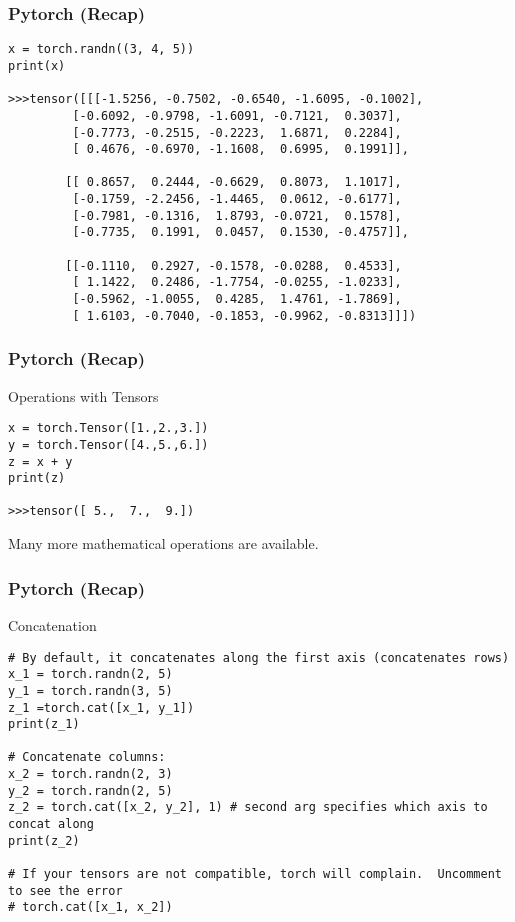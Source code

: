 \begin{frame}[fragile]
\frametitle{Pytorch (Recap)}
 \begin{lstlisting}
x = torch.randn((3, 4, 5))
print(x)

>>>tensor([[[-1.5256, -0.7502, -0.6540, -1.6095, -0.1002],
         [-0.6092, -0.9798, -1.6091, -0.7121,  0.3037],
         [-0.7773, -0.2515, -0.2223,  1.6871,  0.2284],
         [ 0.4676, -0.6970, -1.1608,  0.6995,  0.1991]],

        [[ 0.8657,  0.2444, -0.6629,  0.8073,  1.1017],
         [-0.1759, -2.2456, -1.4465,  0.0612, -0.6177],
         [-0.7981, -0.1316,  1.8793, -0.0721,  0.1578],
         [-0.7735,  0.1991,  0.0457,  0.1530, -0.4757]],

        [[-0.1110,  0.2927, -0.1578, -0.0288,  0.4533],
         [ 1.1422,  0.2486, -1.7754, -0.0255, -1.0233],
         [-0.5962, -1.0055,  0.4285,  1.4761, -1.7869],
         [ 1.6103, -0.7040, -0.1853, -0.9962, -0.8313]]])
 \end{lstlisting}

 \end{frame} 
 
\begin{frame}[fragile]
\frametitle{Pytorch (Recap)}
Operations with Tensors
 \begin{lstlisting}
x = torch.Tensor([1.,2.,3.])
y = torch.Tensor([4.,5.,6.])
z = x + y
print(z)

>>>tensor([ 5.,  7.,  9.])
 \end{lstlisting}
Many more mathematical operations are available.
 \end{frame} 
 
\begin{frame}[fragile]
\frametitle{Pytorch (Recap)}
Concatenation
 \begin{lstlisting}
# By default, it concatenates along the first axis (concatenates rows)
x_1 = torch.randn(2, 5)
y_1 = torch.randn(3, 5)
z_1 =torch.cat([x_1, y_1])
print(z_1)

# Concatenate columns:
x_2 = torch.randn(2, 3)
y_2 = torch.randn(2, 5)
z_2 = torch.cat([x_2, y_2], 1) # second arg specifies which axis to concat along
print(z_2)

# If your tensors are not compatible, torch will complain.  Uncomment to see the error
# torch.cat([x_1, x_2])
 \end{lstlisting}
 \end{frame} 
 
